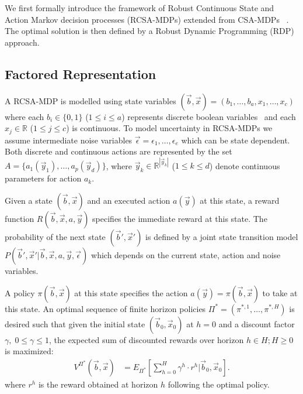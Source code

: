 We first formally introduce the framework of Robust Continuous State and Action Markov decision processes (RCSA-MDPs) extended from CSA-MDPs ~\cite{sdp_aaai}. The optimal solution is then defined by a Robust Dynamic Programming (RDP) approach. 
\subsection{Factored Representation}

A RCSA-MDP is modelled using state variables $(\vec{b},\vec{x}) = ( b_1,\ldots,b_a,x_{1},\ldots,x_c )$ where each $b_i \in \{ 0,1 \}$ ($1 \leq i \leq a$) represents discrete boolean variables $\,$
and each $x_j \in \mathbb{R}$ ($1 \leq j \leq c$) is continuous.  To model uncertainty in RCSA-MDPs we assume intermediate noise variables $\vec{\epsilon} = \epsilon_1, \ldots , \epsilon_e$ which can be state dependent. 
Both discrete and continuous actions are represented by the set $A = \{a_1(\vec{y}_1), \ldots, a_p(\vec{y}_d) \}$, where  $\vec{y}_k \in \mathbb{R}^{|\vec{y}_k|}$ ($1\leq k \leq d$) denote continuous parameters for action $a_k$. 

Given a state $(\vec{b},\vec{x})$ and an executed action $a(\vec{y})$ at this state, a
reward function $R(\vec{b},\vec{x},a,\vec{y})$ specifies the immediate reward at this state. The probability of the next state $(\vec{b}',\vec{x}')$ is defined by a joint state transition model $P(\vec{b}',\vec{x}'| \vec{b},\vec{x},a,\vec{y},\vec{\epsilon})$ which depends on the current state, action and noise variables.

A policy $\pi(\vec{b},\vec{x})$ at this state specifies the action $a(\vec{y}) =
\pi(\vec{b},\vec{x})$ to take at this state.  An optimal sequence of finite horizon policies $\Pi^* = (\pi^{*,1},\ldots,\pi^{*,H})$ is desired such that given the initial state $(\vec{b}_0,\vec{x}_0)$ at $h=0$ and  a discount factor $\gamma, \; 0 \leq \gamma \leq 1$, the expected sum of discounted rewards over horizon $h \in H ;H \geq 0$ is maximized: 
\begin{align}
V^{\Pi^*}(\vec{b},\vec{x}) & = E_{\Pi^*} \left[ \sum_{h=0}^{H} \gamma^h \cdot r^h \Big| \vec{b}_0,\vec{x}_0\right].
\end{align}
where $r^h$ is the reward obtained at horizon $h$ following the optimal policy. 

